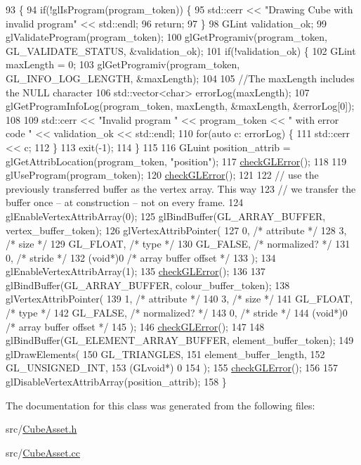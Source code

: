 \begin{DoxyCode}
93                                          \{
94   \textcolor{keywordflow}{if}(!glIsProgram(program\_token)) \{
95     std::cerr << \textcolor{stringliteral}{"Drawing Cube with invalid program"} << std::endl;
96     \textcolor{keywordflow}{return};
97   \}
98   GLint validation\_ok;
99   glValidateProgram(program\_token);
100   glGetProgramiv(program\_token, GL\_VALIDATE\_STATUS, &validation\_ok);
101   \textcolor{keywordflow}{if}(!validation\_ok) \{
102     GLint maxLength = 0;
103     glGetProgramiv(program\_token, GL\_INFO\_LOG\_LENGTH, &maxLength);
104 
105     \textcolor{comment}{//The maxLength includes the NULL character}
106     std::vector<char> errorLog(maxLength);
107     glGetProgramInfoLog(program\_token, maxLength, &maxLength, &errorLog[0]);
108 
109     std::cerr << \textcolor{stringliteral}{"Invalid program "} << program\_token << \textcolor{stringliteral}{" with error code "} << validation\_ok << std::endl;
110     \textcolor{keywordflow}{for}(\textcolor{keyword}{auto} c: errorLog) \{
111       std::cerr << c;
112     \}
113     exit(-1);
114   \}
115 
116   GLuint position\_attrib = glGetAttribLocation(program\_token, \textcolor{stringliteral}{"position"});
117   \hyperlink{CubeAsset_8cc_a75f201b0e53e68726854997957322b8d}{checkGLError}();
118 
119   glUseProgram(program\_token);
120   \hyperlink{CubeAsset_8cc_a75f201b0e53e68726854997957322b8d}{checkGLError}();
121 
122   \textcolor{comment}{// use the previously transferred buffer as the vertex array.  This way}
123   \textcolor{comment}{// we transfer the buffer once -- at construction -- not on every frame.}
124   glEnableVertexAttribArray(0);
125   glBindBuffer(GL\_ARRAY\_BUFFER, vertex\_buffer\_token);
126   glVertexAttribPointer(
127     0,        \textcolor{comment}{/* attribute */}
128     3,        \textcolor{comment}{/* size */}
129     GL\_FLOAT,   \textcolor{comment}{/* type */}
130     GL\_FALSE,   \textcolor{comment}{/* normalized? */}
131     0,        \textcolor{comment}{/* stride */}
132     (\textcolor{keywordtype}{void}*)0    \textcolor{comment}{/* array buffer offset */}
133   );
134   glEnableVertexAttribArray(1);
135   \hyperlink{CubeAsset_8cc_a75f201b0e53e68726854997957322b8d}{checkGLError}();
136 
137   glBindBuffer(GL\_ARRAY\_BUFFER, colour\_buffer\_token);
138   glVertexAttribPointer(
139     1,        \textcolor{comment}{/* attribute */}
140     3,        \textcolor{comment}{/* size */}
141     GL\_FLOAT,   \textcolor{comment}{/* type */}
142     GL\_FALSE,   \textcolor{comment}{/* normalized? */}
143     0,        \textcolor{comment}{/* stride */}
144     (\textcolor{keywordtype}{void}*)0    \textcolor{comment}{/* array buffer offset */}
145   );
146   \hyperlink{CubeAsset_8cc_a75f201b0e53e68726854997957322b8d}{checkGLError}();
147 
148   glBindBuffer(GL\_ELEMENT\_ARRAY\_BUFFER, element\_buffer\_token);
149   glDrawElements(
150     GL\_TRIANGLES,
151     element\_buffer\_length,
152     GL\_UNSIGNED\_INT,
153     (GLvoid*) 0
154   );
155   \hyperlink{CubeAsset_8cc_a75f201b0e53e68726854997957322b8d}{checkGLError}();
156 
157   glDisableVertexAttribArray(position\_attrib);
158 \}
\end{DoxyCode}


The documentation for this class was generated from the following files\+:\begin{DoxyCompactItemize}
\item 
src/\hyperlink{CubeAsset_8h}{Cube\+Asset.\+h}\item 
src/\hyperlink{CubeAsset_8cc}{Cube\+Asset.\+cc}\end{DoxyCompactItemize}
